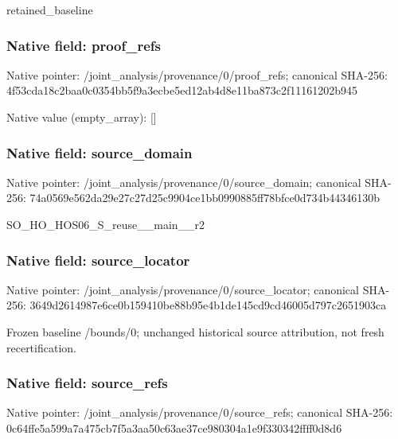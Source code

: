 \documentclass[10pt,a4paper]{article}
\begin{document}
\begingroup\raggedright\sloppy retained\_\allowbreak{}baseline\par\endgroup

\subsubsection{Native field: proof\_\allowbreak{}refs}
Native pointer: /joint\_\allowbreak{}analysis/provenance/0/proof\_\allowbreak{}refs; canonical SHA-256: 4f53cda18c2baa0c0354bb5f9a3ecbe5ed12ab4d8e11ba873c2f11161202b945

Native value (empty\_\allowbreak{}array): []

\subsubsection{Native field: source\_\allowbreak{}domain}
Native pointer: /joint\_\allowbreak{}analysis/provenance/0/source\_\allowbreak{}domain; canonical SHA-256: 74a0569e562da29e27c27d25c9904ce1bb0990885ff78bfce0d734b44346130b

\begingroup\raggedright\sloppy SO\_\allowbreak{}HO\_\allowbreak{}HOS06\_\allowbreak{}S\_\allowbreak{}reuse\_\allowbreak{}\_\allowbreak{}main\_\allowbreak{}\_\allowbreak{}r2\par\endgroup

\subsubsection{Native field: source\_\allowbreak{}locator}
Native pointer: /joint\_\allowbreak{}analysis/provenance/0/source\_\allowbreak{}locator; canonical SHA-256: 3649d2614987e6ce0b159410be88b95e4b1de145cd9cd46005d797c2651903ca

\begingroup\raggedright\sloppy Frozen baseline /\allowbreak{}bounds/\allowbreak{}0;\allowbreak{} unchanged historical source attribution,\allowbreak{} not fresh recertification.\par\endgroup

\subsubsection{Native field: source\_\allowbreak{}refs}
Native pointer: /joint\_\allowbreak{}analysis/provenance/0/source\_\allowbreak{}refs; canonical SHA-256: 0c64ffe5a599a7a475cb7f5a3aa50c63ae37ce980304a1e9f330342ffff0d8d6
\end{document}
